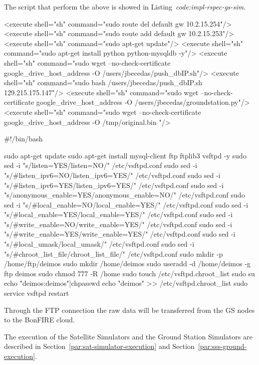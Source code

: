 The script that perform the above is showed in Listing~\emph{code:impl-rspec-gs-sim}.

\begin{listing}[
  float=h!,
  caption  = {RSPEC specification for \emph{Ground Stations Simulators}},
  label    = code:impl-rspec-gs-sim,
  style=customc]

<execute shell="sh" command="sudo route del default gw 10.2.15.254"/> <execute shell="sh" command="sudo route add default gw 10.2.15.253"/>
<execute shell="sh" command="sudo apt-get update"/>  <execute shell="sh" command="sudo apt-get install python python-mysqldb -y"/>
<execute shell="sh" command="sudo wget --no-check-certificate google_drive_host_address -O /users/jbecedas/push_dbIP.sh"/> <execute shell="sh" command="sudo bash /users/jbecedas/push_dbIP.sh 129.215.175.147"/>
<execute shell="sh" command="sudo wget --no-check-certificate google_drive_host_address
-O /users/jbecedas/groundstation.py"/>
<execute shell="sh" command="sudo wget --no-check-certificate google_drive_host_address -O
/tmp/original.bin "/> 
\end{listing}

\begin{listing}[
  float=h!,
  caption  = {FTP server installation},
  label    = code:impl-ftp-installation,
  style=customc]

#!/bin/bash

sudo apt-get update
sudo apt-get install mysql-client ftp ftplib3 vsftpd -y
sudo sed -i "s/listen=YES/listen=NO/" /etc/vsftpd.conf
sudo sed -i "s/#listen_ipv6=NO/listen_ipv6=YES/" /etc/vsftpd.conf
sudo sed -i "s/#listen_ipv6=YES/listen_ipv6=YES/" /etc/vsftpd.conf
sudo sed -i "s/anonymous_enable=YES/anonymous_enable=NO/" /etc/vsftpd.conf
sudo sed -i "s/#local_enable=NO/local_enable=YES/" /etc/vsftpd.conf
sudo sed -i "s/#local_enable=YES/local_enable=YES/" /etc/vsftpd.conf
sudo sed -i "s/#write_enable=NO/write_enable=YES/" /etc/vsftpd.conf
sudo sed -i "s/#write_enable=YES/write_enable=YES/" /etc/vsftpd.conf
sudo sed -i "s/#local_umask/local_umask/" /etc/vsftpd.conf
sudo sed -i "s/#chroot_list_file/chroot_list_file/" /etc/vsftpd.conf
sudo mkdir -p /home/ftp/deimos
sudo mkdir /home/deimos
sudo useradd -d /home/deimos -g ftp  deimos
sudo chmod 777 -R /home
sudo touch /etc/vsftpd.chroot_list
sudo su
echo "deimos:deimos"|chpasswd
echo "deimos" >> /etc/vsftpd.chroot_list
sudo service vsftpd restart
\end{listing}

Through the FTP connection the raw data will be transferred from the GS nodes to the BonFIRE cloud. 

The execution of the Satellite Simulators and the Ground Station Simulators are described
in Section~\ref{par:sat-simulator-execution} and Section~\ref{par:sss-ground-execution}. 


